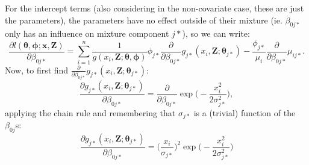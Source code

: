 \documentclass[10pt]{article}
\begin{document}
For the intercept terms (also considering in the non-covariate case, these are just the parameters), the parameters have no effect outside of their mixture (ie. $\beta_{0j*}$ only has an influence on mixture component $j*$), so we can write:
\begin{equation*}
\frac{\partial l(\boldsymbol{\theta},\boldsymbol{\phi}; \mathbf{x},\mathbf{Z})}{\partial \beta_{0j*}} = \sum_{i=1}^n \frac{1}{g(x_i,\mathbf{Z}; \boldsymbol{\theta},\boldsymbol{\phi})} \phi_{j*} \frac{\partial}{\partial \beta_{0j*}} g_{j*}(x_i,\mathbf{Z}; \boldsymbol{\theta}_{j*})  - \frac{\phi_{j*}}{\mu_i}  \frac{\partial}{\partial \beta_{0j*}} \mu_{ij*}.
\end{equation*}
Now, to first find $\frac{\partial}{\partial \beta_{0j*}} g_{j*}(x_i,\mathbf{Z}; \boldsymbol{\theta}_{j*})$:
\begin{equation*}
\frac{\partial g_{j*}(x_i,\mathbf{Z}; \boldsymbol{\theta}_{j*})}{\partial \beta_{0j*}} = \frac{\partial}{\partial \beta_{0j*}} \exp\Big( -\frac{x_i^2}{2\sigma_{j*}^2} \Big),
\end{equation*}
applying the chain rule and remembering that $\sigma_{j*}$ is a (trivial) function of the $\beta_{0j}$s:
\begin{equation*}
\frac{\partial g_{j*}(x_i,\mathbf{Z}; \boldsymbol{\theta}_{j*})}{\partial \beta_{0j*}} = \Big( \frac{x_i}{\sigma_{j*}}\Big)^2 \exp \Big(-\frac{x_i^2}{2 \sigma_{j*}^2}\Big)
\end{equation*}
\end{document}
